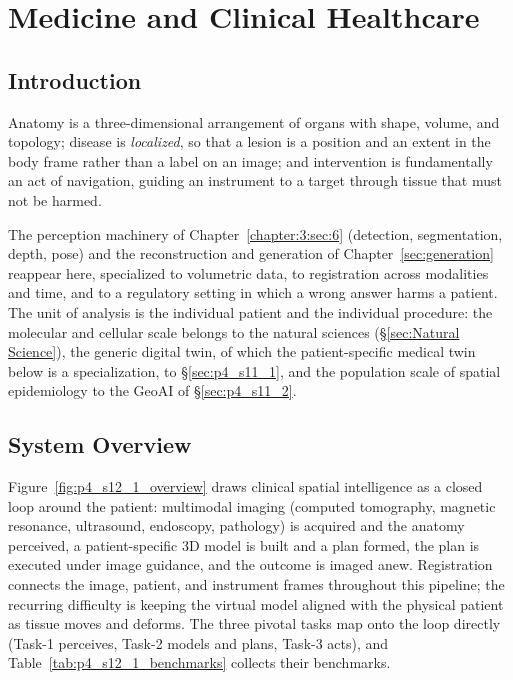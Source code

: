 \section{Medicine and Clinical Healthcare}
\label{sec:p4_s12_1}

\subsection{Introduction}
\label{subsec:p4-sec12-1-introduction}

Anatomy is a three-dimensional arrangement of organs with shape, volume, and topology; disease is \emph{localized}, so that a lesion is a position and an extent in the body frame rather than a label on an image; and intervention is fundamentally an act of navigation, guiding an instrument to a target through tissue that must not be harmed.

The perception machinery of Chapter~\ref{chapter:3:sec:6} (detection, segmentation, depth, pose) and the reconstruction and generation of Chapter~\ref{sec:generation} reappear here, specialized to volumetric data, to registration across modalities and time, and to a regulatory setting in which a wrong answer harms a patient. 
The unit of analysis is the individual patient and the individual procedure: the molecular and cellular scale belongs to the natural sciences (§\ref{sec:Natural Science}), the generic digital twin, of which the patient-specific medical twin below is a specialization, to §\ref{sec:p4_s11_1}, and the population scale of spatial epidemiology to the GeoAI of §\ref{sec:p4_s11_2}.

\subsection{System Overview}
\label{subsec:p4-sec12-1-system-overview}

Figure~\ref{fig:p4_s12_1_overview} draws clinical spatial intelligence as a closed loop around the patient: multimodal imaging (computed tomography, magnetic resonance, ultrasound, endoscopy, pathology) is acquired and the anatomy perceived, a patient-specific 3D model is built and a plan formed, the plan is executed under image guidance, and the outcome is imaged anew. 
Registration connects the image, patient, and instrument frames throughout this pipeline; the recurring difficulty is keeping the virtual model aligned with the physical patient as tissue moves and deforms. The three pivotal tasks map onto the loop directly (Task-1 perceives, Task-2 models and plans, Task-3 acts), and Table~\ref{tab:p4_s12_1_benchmarks} collects their benchmarks.


